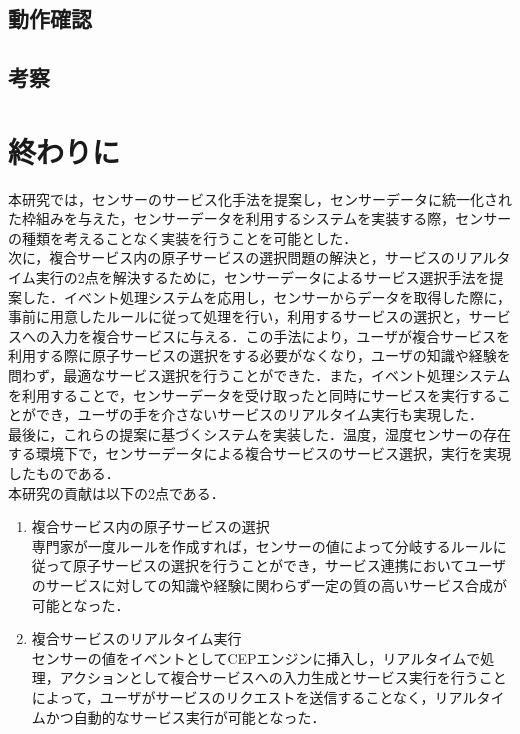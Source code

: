\documentclass{kuisthesis}			%
\begin{document}
\subsection{動作確認}
\subsection{考察}




\section{終わりに}
本研究では，センサーのサービス化手法を提案し，センサーデータに統一化された枠組みを与えた，センサーデータを利用するシステムを実装する際，センサーの種類を考えることなく実装を行うことを可能とした．\\
次に，複合サービス内の原子サービスの選択問題の解決と，サービスのリアルタイム実行の2点を解決するために，センサーデータによるサービス選択手法を提案した．イベント処理システムを応用し，センサーからデータを取得した際に，事前に用意したルールに従って処理を行い，利用するサービスの選択と，サービスへの入力を複合サービスに与える．この手法により，ユーザが複合サービスを利用する際に原子サービスの選択をする必要がなくなり，ユーザの知識や経験を問わず，最適なサービス選択を行うことができた．また，イベント処理システムを利用することで，センサーデータを受け取ったと同時にサービスを実行することができ，ユーザの手を介さないサービスのリアルタイム実行も実現した．\\
最後に，これらの提案に基づくシステムを実装した．温度，湿度センサーの存在する環境下で，センサーデータによる複合サービスのサービス選択，実行を実現したものである．\\
本研究の貢献は以下の2点である．
\begin{enumerate}
\item 複合サービス内の原子サービスの選択\\
専門家が一度ルールを作成すれば，センサーの値によって分岐するルールに従って原子サービスの選択を行うことができ，サービス連携においてユーザのサービスに対しての知識や経験に関わらず一定の質の高いサービス合成が可能となった．
\item 複合サービスのリアルタイム実行\\
センサーの値をイベントとしてCEPエンジンに挿入し，リアルタイムで処理，アクションとして複合サービスへの入力生成とサービス実行を行うことによって，ユーザがサービスのリクエストを送信することなく，リアルタイムかつ自動的なサービス実行が可能となった．
\end{enumerate}
\end{document}
